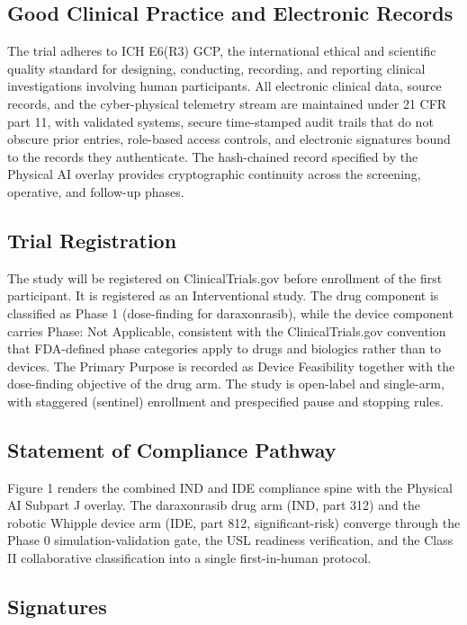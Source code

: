 \subsection{Good Clinical Practice and Electronic Records}

The trial adheres to ICH E6(R3) GCP, the international ethical and scientific
quality standard for designing, conducting, recording, and reporting clinical
investigations involving human participants. All electronic clinical data,
source records, and the cyber-physical telemetry stream are maintained under 21
CFR part 11, with validated systems, secure time-stamped audit trails that do not
obscure prior entries, role-based access controls, and electronic signatures
bound to the records they authenticate. The hash-chained record specified by the
Physical AI overlay provides cryptographic continuity across the screening,
operative, and follow-up phases.

\subsection{Trial Registration}

The study will be registered on ClinicalTrials.gov before enrollment of the
first participant. It is registered as an Interventional study. The drug
component is classified as Phase 1 (dose-finding for daraxonrasib), while the
device component carries Phase: Not Applicable, consistent with the
ClinicalTrials.gov convention that FDA-defined phase categories apply to drugs
and biologics rather than to devices. The Primary Purpose is recorded as Device
Feasibility together with the dose-finding objective of the drug arm. The study
is open-label and single-arm, with staggered (sentinel) enrollment and
prespecified pause and stopping rules.

\subsection{Statement of Compliance Pathway}

Figure 1 renders the combined IND and IDE compliance spine with the Physical AI
Subpart J overlay. The daraxonrasib drug arm (IND, part 312) and the robotic
Whipple device arm (IDE, part 812, significant-risk) converge through the
Phase 0 simulation-validation gate, the USL readiness verification, and the
Class II collaborative classification into a single first-in-human protocol.

\subsection{Signatures}

